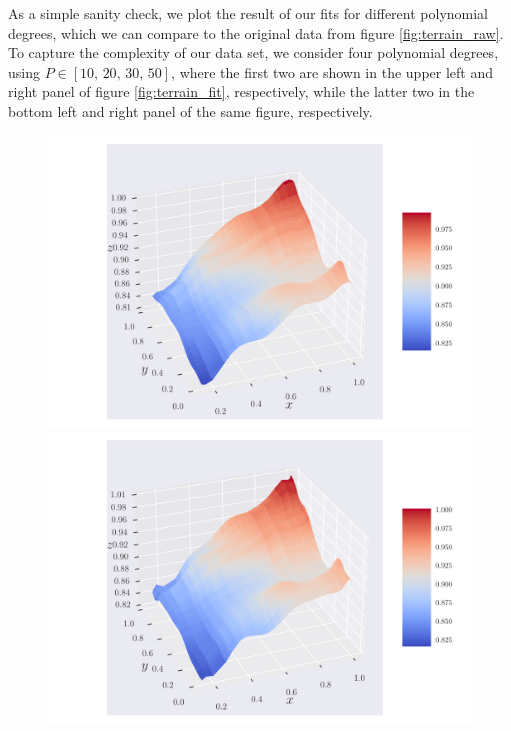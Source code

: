 \documentclass[reprint,english,notitlepage,aps,nobalancelastpage,nofootinbib]{revtex4-1}  %
\begin{document}
As a simple sanity check, we plot the result of our fits for different polynomial degrees, which we can compare to the original data from figure \ref{fig:terrain_raw}. To capture the complexity of our data set, we consider four polynomial degrees, using $P\in[10,\,20,\,30,\,50]$, where the first two are shown in the upper left and right panel of figure \ref{fig:terrain_fit}, respectively, while the latter two in the bottom left and right panel of the same figure, respectively.

\begin{figure}[H]
	\includegraphics[width=\linewidth]{SRTM_prediction_p10.pdf}
	\endminipage\hfill
	\includegraphics[width=\linewidth]{SRTM_prediction_p20.pdf}
	\endminipage\hfill

\end{figure}
\end{document}
